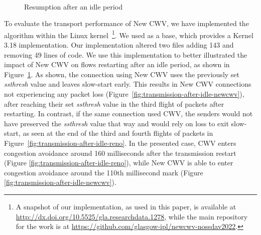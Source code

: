 \documentclass[10pt,sigconf]{acmart}
\begin{document}
\begin{figure}[t!]
  \centering
  \\
    \caption{Resumption after an idle period}
    \label{fig:transmission-after-idle}
\end{figure}

To evaluate the transport performance of New CWV, we have implemented the algorithm within the Linux kernel~\footnote{A snapshot of our implementation, as used in this paper, is available at \url{http://dx.doi.org/10.5525/gla.researchdata.1278}, while the main repository for the work is at \url{https://github.com/glasgow-ipl/newcwv-nossdav2022}.}. We used \cite{online-newcwv-base} as a base, which provides a Kernel 3.18 implementation. Our implementation altered two files adding 143 and removing 49 lines of code. We use this implementation to better illustrated the impact of New CWV on flows restarting after an idle period, as shown in Figure~\ref{fig:transmission-after-idle}.
As shown, the connection using New CWV uses the previously set \emph{ssthresh} value and leaves slow-start early. This results in New CWV connections not experiencing any packet loss (Figure~\ref{fig:transmission-after-idle-newcwv}), after reaching their set \emph{ssthresh} value in the third flight of packets after restarting. In contrast, if the same connection used CWV, the senders would not have preserved the \emph{ssthresh} value that way and would rely on loss to exit slow-start, as seen at the end of the third and fourth flights of packets in Figure~\ref{fig:transmission-after-idle-reno}. In the presented case, CWV enters congestion avoidance around 160 milliseconds after the transmission restart (Figure \ref{fig:transmission-after-idle-reno}), while New CWV is able to enter congestion avoidance around the 110th millisecond mark (Figure \ref{fig:transmission-after-idle-newcwv}).
\end{document}
